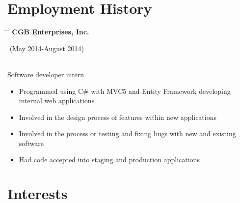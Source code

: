 \documentclass[10pt]{article} %
\begin{document}

\section{Employment History}
\vspace{-6mm}

\parbox{0.5\textwidth}{ %
\begin{tabbing} %
\hspace{2cm} \= \hspace{3cm} \= \kill %
\textbf{CGB Enterprises, Inc.}
\end{tabbing}}
\hfill %
\parbox{0.5\textwidth}{ %
\begin{tabbing} %
\hspace{5cm} \= \kill %
(May 2014-August 2014)
\end{tabbing}}
\vspace{-3mm}
\\Software developer intern
\vspace{-2mm}
\begin{itemize}
\item Programmed using C\# with MVC5 and Entity Framework developing internal web applications
\vspace{-3mm}
\item Involved in the design process of features within new applications
\vspace{-3mm}
\item Involved in the process or testing and fixing bugs with new and existing software
\vspace{-3mm}
\item Had code accepted into staging and production applications
\vspace{-3mm}
\end{itemize}


\section{Interests}
\vspace{-3mm}
\end{document}
